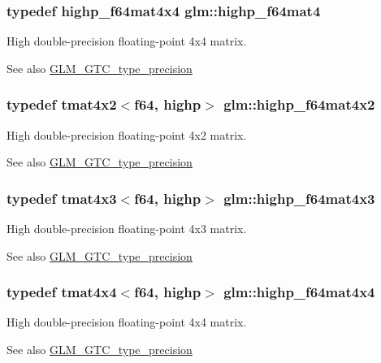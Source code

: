 \subsubsection[{highp\+\_\+f64mat4}]{\setlength{\rightskip}{0pt plus 5cm}typedef {\bf highp\+\_\+f64mat4x4} {\bf glm\+::highp\+\_\+f64mat4}}\label{namespaceglm_a1ac5d0564721a22765c68c54a0a4f87a}
High double-\/precision floating-\/point 4x4 matrix. \begin{DoxySeeAlso}{See also}
\hyperlink{group__gtc__type__precision}{G\+L\+M\+\_\+\+G\+T\+C\+\_\+type\+\_\+precision} 
\end{DoxySeeAlso}
\hypertarget{namespaceglm_a44d43f20896a22ab1ce1b4e57328d361}{}
\subsubsection[{highp\+\_\+f64mat4x2}]{\setlength{\rightskip}{0pt plus 5cm}typedef tmat4x2$<${\bf f64}, highp$>$ {\bf glm\+::highp\+\_\+f64mat4x2}}\label{namespaceglm_a44d43f20896a22ab1ce1b4e57328d361}
High double-\/precision floating-\/point 4x2 matrix. \begin{DoxySeeAlso}{See also}
\hyperlink{group__gtc__type__precision}{G\+L\+M\+\_\+\+G\+T\+C\+\_\+type\+\_\+precision} 
\end{DoxySeeAlso}
\hypertarget{namespaceglm_acd0f3feb3b494d0f8c5d14c810158874}{}
\subsubsection[{highp\+\_\+f64mat4x3}]{\setlength{\rightskip}{0pt plus 5cm}typedef tmat4x3$<${\bf f64}, highp$>$ {\bf glm\+::highp\+\_\+f64mat4x3}}\label{namespaceglm_acd0f3feb3b494d0f8c5d14c810158874}
High double-\/precision floating-\/point 4x3 matrix. \begin{DoxySeeAlso}{See also}
\hyperlink{group__gtc__type__precision}{G\+L\+M\+\_\+\+G\+T\+C\+\_\+type\+\_\+precision} 
\end{DoxySeeAlso}
\hypertarget{namespaceglm_a5eaa2eab37098d6d953cabeba8a57d57}{}
\subsubsection[{highp\+\_\+f64mat4x4}]{\setlength{\rightskip}{0pt plus 5cm}typedef tmat4x4$<${\bf f64}, highp$>$ {\bf glm\+::highp\+\_\+f64mat4x4}}\label{namespaceglm_a5eaa2eab37098d6d953cabeba8a57d57}
High double-\/precision floating-\/point 4x4 matrix. \begin{DoxySeeAlso}{See also}
\hyperlink{group__gtc__type__precision}{G\+L\+M\+\_\+\+G\+T\+C\+\_\+type\+\_\+precision} 
\end{DoxySeeAlso}
\hypertarget{namespaceglm_a50e023f42b7d0e2f40eff32ace71ae1a}{}
